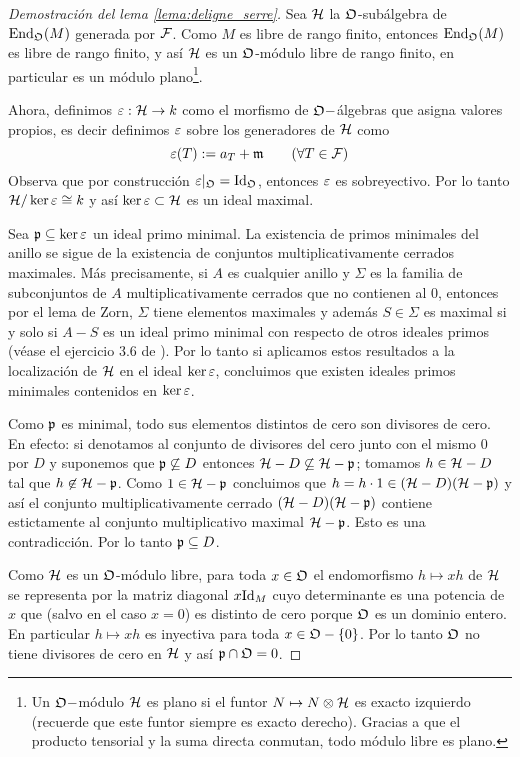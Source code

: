 \begin{proof}[Demostraci\'on del lema \ref{lema:deligne_serre}]
  Sea $\mathcal{H}$ la $\mathfrak{O}$-sub\'algebra de $\mathrm{End}_{\mathfrak{O}}(M)$ generada por $\mathcal{F}$. Como $M$ es libre de rango finito, entonces $\mathrm{End}_{\mathfrak{O}}(M)$ es libre de rango finito, y as\'i $\mathcal{H}$ es un $\mathfrak{O}$-m\'odulo libre de rango finito, en particular es un m\'odulo plano\footnote{Un $\mathfrak{O}-$m\'odulo $\mathcal{H}$ es plano si el funtor $N\mapsto N\otimes\mathcal{H}$ es exacto izquierdo (recuerde que este funtor siempre es exacto derecho). Gracias a que el producto tensorial y la suma directa conmutan, todo m\'odulo libre es plano.}.

  Ahora, definimos $\varepsilon:\mathcal{H}\rightarrow k$ como el morfismo de $\mathfrak{O}-$álgebras que asigna valores propios, es decir definimos $\varepsilon$ sobre los generadores de $\mathcal{H}$ como
  \[
    \varepsilon(T):=a_T+\mathfrak{m}\qquad(\forall T\in\mathcal{F})
  \]
Observa que  por construcci\'on $\varepsilon|_{\mathfrak{O}}=\mathrm{Id}_{\mathfrak{O}}$, entonces $\varepsilon$ es sobreyectivo. Por lo tanto $\mathcal{H}/\ker\varepsilon\cong k$ y as\'i $\ker\varepsilon\subset\mathcal{H}$ es un ideal maximal.

Sea $\mathfrak{p}\subseteq\ker\varepsilon$ un ideal primo minimal. La existencia de primos minimales del anillo se sigue de la existencia de conjuntos multiplicativamente cerrados maximales. M\'as precisamente, si $A$ es cualquier anillo y $\Sigma$ es la familia de subconjuntos de $A$ multiplicativamente cerrados que no contienen al 0, entonces por el lema de Zorn, $\Sigma$ tiene elementos maximales y adem\'as $S\in\Sigma$ es maximal si y solo si $A-S$ es un ideal primo minimal con respecto de otros ideales primos (v\'ease el ejercicio 3.6 de \cite[\S3]{AtiyahCA}). Por lo tanto si aplicamos estos resultados a la localizaci\'on de $\mathcal{H}$ en el ideal $\ker\varepsilon$, concluimos que existen ideales primos minimales contenidos en $\ker\varepsilon$.

Como $\mathfrak{p}$ es minimal, todo sus elementos distintos de cero son divisores de cero. En efecto: si denotamos al conjunto de divisores del cero junto con el mismo 0 por $D$ y suponemos que $\mathfrak{p}\not\subseteq D$ entonces $\mathcal{H}-D\not\subseteq\mathcal{H}-\mathfrak{p}$; tomamos $h\in\mathcal{H}-D$ tal que $h\not\in\mathcal{H}-\mathfrak{p}$. Como $1\in\mathcal{H}-\mathfrak{p}$ concluimos que $h=h\cdot1\in(\mathcal{H}-D)(\mathcal{H}-\mathfrak{p})$ y as\'i el conjunto multiplicativamente cerrado $(\mathcal{H}-D)(\mathcal{H}-\mathfrak{p})$ contiene estictamente al conjunto multiplicativo maximal $\mathcal{H}-\mathfrak{p}$. Esto es una contradicci\'on. Por lo tanto $\mathfrak{p}\subseteq D$.

  Como $\mathcal{H}$ es un $\mathfrak{O}$-m\'odulo libre, para toda $x\in\mathfrak{O}$ el endomorfismo $h\mapsto xh$ de $\mathcal{H}$ se representa por la matriz diagonal $x\mathrm{Id}_M$ cuyo determinante es una potencia de $x$ que (salvo en el caso $x=0$) es distinto de cero porque $\mathfrak{O}$ es un dominio entero. En particular $h\mapsto xh$ es inyectiva para toda $x\in\mathfrak{O}-\{0\}$. Por lo tanto $\mathfrak{O}$ no tiene divisores de cero en $\mathcal{H}$ y as\'i $\mathfrak{p}\cap\mathfrak{O}=0$.


\end{proof}
